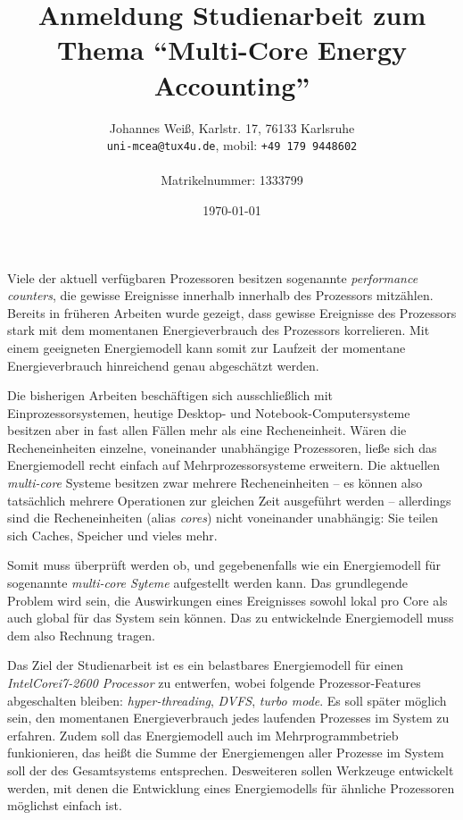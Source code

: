 \documentclass[a4paper,DIV=16]{scrartcl}
\newcommand{\JWemail}[1]{\texttt{#1}}
\newcommand{\JWphone}[1]{\texttt{#1}}
\newcommand{\JWemph}[1]{\emph{#1}}
\newcommand{\JWproduct}[1]{\JWemph{#1}}
\newcommand{\JWlone}[1]{\medskip}
\def\TReg{\textsuperscript{\textregistered}}
\def\TTra{\textsuperscript{\texttrademark}}
\begin{document}
\pagestyle{empty}

\title{Anmeldung Studienarbeit zum Thema "`Multi-Core Energy Accounting"'}
\author{
  Johannes Weiß, Karlstr. 17, 76133 Karlsruhe\\
  \JWemail{uni-mcea@tux4u.de}, mobil: \JWphone{+49 179 9448602}\\
  \\
  Matrikelnummer: 1333799
}
\date{\today}
\maketitle
\thispagestyle{empty}
\pagestyle{empty}

\JWlone{Grundlagen}

Viele der aktuell verfügbaren Prozessoren besitzen sogenannte
\JWemph{performance counters}, die gewisse Ereignisse innerhalb innerhalb des
Prozessors mitzählen. Bereits in früheren Arbeiten wurde gezeigt, dass gewisse
Ereignisse des Prozessors stark mit dem momentanen Energieverbrauch des
Prozessors korrelieren. Mit einem geeigneten Energiemodell kann somit zur
Laufzeit der momentane Energieverbrauch hinreichend genau abgeschätzt werden.

\JWlone{Related Work}

Die bisherigen Arbeiten beschäftigen sich ausschließlich mit
Einprozessorsystemen, heutige Desktop- und Notebook-Computersysteme besitzen
aber in fast allen Fällen mehr als eine Recheneinheit. Wären die Recheneinheiten
einzelne, voneinander unabhängige Prozessoren, ließe sich das Energiemodell
recht einfach auf Mehrprozessorsysteme erweitern. Die aktuellen
\JWemph{multi-core} Systeme besitzen zwar mehrere Recheneinheiten -- es können
also tatsächlich mehrere Operationen zur gleichen Zeit ausgeführt werden --
allerdings sind die Recheneinheiten (alias \JWemph{cores}) nicht voneinander
unabhängig: Sie teilen sich Caches, Speicher und vieles mehr.


\JWlone{Problem}

Somit muss überprüft werden ob, und gegebenenfalls wie ein Energiemodell für
sogenannte \JWemph{multi-core Syteme} aufgestellt werden kann.  Das grundlegende
Problem wird sein, die Auswirkungen eines Ereignisses sowohl lokal pro Core als
auch global für das System sein können. Das zu entwickelnde Energiemodell muss
dem also Rechnung tragen.


\JWlone{Ziele}

Das Ziel der Studienarbeit ist es ein belastbares Energiemodell für einen
\JWproduct{Intel\TReg Core\TTra i7-2600 Processor} zu entwerfen, wobei folgende
Prozessor-Features abgeschalten bleiben: \JWemph{hyper-threading},
\JWemph{DVFS}, \JWemph{turbo mode}. Es soll später möglich sein, den momentanen
Energieverbrauch jedes laufenden Prozesses im System zu erfahren. Zudem soll das
Energiemodell auch im Mehrprogrammbetrieb funkionieren, das heißt die Summe der
Energiemengen aller Prozesse im System soll der des Gesamtsystems entsprechen.
Desweiteren sollen Werkzeuge entwickelt werden, mit denen die Entwicklung eines
Energiemodells für ähnliche Prozessoren möglichst einfach ist.
\end{document}
